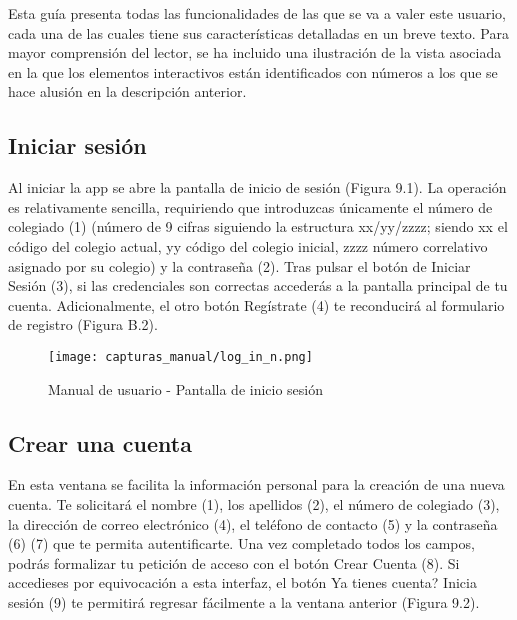 \documentclass[11pt,spanish,
		listoftables,listoffigures]
		{tfgplantilla}
\begin{document}
Esta guía presenta todas las funcionalidades de las que se va a valer este usuario, cada una de las cuales tiene sus características detalladas en un breve texto. Para mayor comprensión del lector, se ha incluido una ilustración de la vista asociada en la que los elementos interactivos están identificados con números a los que se hace alusión en la descripción anterior.

\subsection {Iniciar sesión}


Al iniciar la app se abre la pantalla de inicio de sesión (Figura 9.1). La operación es relativamente sencilla, requiriendo que introduzcas únicamente el número de colegiado (1) (número de 9 cifras siguiendo la estructura xx/yy/zzzz; siendo xx el código del colegio actual, yy código del colegio inicial, zzzz número correlativo asignado por su colegio) y la contraseña (2). Tras pulsar el botón de \textquotedbl Iniciar Sesión\textquotedbl{} (3), si las credenciales son correctas accederás a la pantalla principal de tu cuenta. Adicionalmente, el otro botón \textquotedbl Regístrate\textquotedbl{} (4) te reconducirá al formulario de registro (Figura B.2).

\begin{figure}[H]
\centering
\texttt{[image: capturas\_manual/log\_in\_n.png]}
\caption{Manual de usuario - Pantalla de inicio sesión}	
\end{figure}

\subsection {Crear una cuenta}

En esta ventana se facilita la información personal para la creación de una nueva cuenta. Te solicitará el nombre (1), los apellidos (2), el número de colegiado (3), la dirección de correo electrónico (4), el teléfono de contacto (5) y la contraseña (6) (7) que te permita autentificarte. Una vez completado todos los campos, podrás formalizar tu petición de acceso con el botón \textquotedbl Crear Cuenta\textquotedbl{} (8). Si accedieses por equivocación a esta interfaz, el botón \textquotedbl Ya tienes cuenta? Inicia sesión\textquotedbl{} (9) te permitirá regresar fácilmente a la ventana anterior (Figura 9.2).
\end{document}
